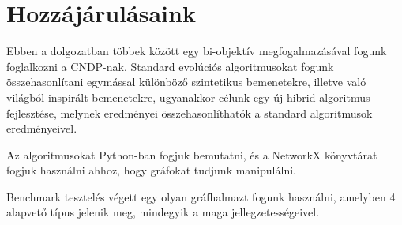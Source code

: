 \section{Hozzájárulásaink}\label{sec:HOZZAJARULASAINK}

Ebben a dolgozatban többek között egy bi-objektív megfogalmazásával fogunk foglalkozni a CNDP-nak.
Standard evolúciós algoritmusokat fogunk összehasonlítani egymással különböző szintetikus
bemenetekre, illetve való világból inspirált bemenetekre,
ugyanakkor célunk egy új hibrid algoritmus fejlesztése,
melynek eredményei összehasonlíthatók a standard algoritmusok eredményeivel.

Az algoritmusokat Python-ban fogjuk bemutatni,
és a NetworkX könyvtárat \cite{hagberg2008exploring} fogjuk használni ahhoz,
hogy gráfokat tudjunk manipulálni.

Benchmark tesztelés végett egy olyan gráfhalmazt fogunk használni, amelyben 4 alapvető
típus jelenik meg, mindegyik a maga jellegzetességeivel.
